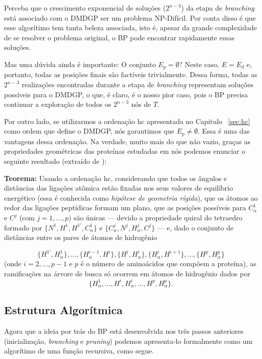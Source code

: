 \documentclass[a4paper,12pt]{article}
\begin{document}
	Perceba que o crescimento exponencial de soluções ($2^{n-3}$) da etapa de \textit{branching} está associado com o DMDGP ser um problema NP-Difícil. Por conta disso é que esse algorítimo tem tanta beleza associada, isto é, apesar da grande complexidade de se resolver o problema original, o BP pode encontrar rapidamente essas soluções.

	Mas uma dúvida ainda é importante: O conjunto $E_p = \emptyset$? Neste caso, $E = E_d$ e, portanto, todas as posições finais são factíveis trivialmente. Dessa forma, todas as $2^{n-3}$ realizações encontradas durante a etapa de \textit{branching} representam soluções possíveis para o DMDGP, o que, é claro, é o nosso pior caso, pois o BP precisa continuar a exploração de todos os $2^{n-3}$ nós de $T$. 
	
	Por outro lado, se utilizarmos a ordenação hc apresentada no Capitulo ~\ref{sec:hc} como ordem que define o DMDGP, nós garantimos que $E_p \neq \emptyset$. Essa é uma das vantagens dessa ordenação. Na verdade, muito mais do que não vazio, graças as propriedades geométricas das proteínas estudadas em \cite{carlile:MinimalOrder} nós podemos enunciar o seguinte resultado (extraído de \cite{carlile:MinimalOrder}): 

	\textbf{Teorema:} Usando a ordenação hc, considerando que todos os ângulos e distâncias das ligações atômica estão fixadas nos seus valores de equilíbrio energético (essa é conhecida como \textit{hipótese de geometria rígida}), que os átomos ao redor das ligações peptídicas formam um plano, que as posições possíveis para $C_\alpha^1$ e $C^j$ (com $j = 1, \dots,p$) são únicas --- devido a propriedade quiral do tetraedro formado por $\{N^1, H^1, H^{1\prime}, C_\alpha^1\}$ e $\{C_\alpha^j, N^j, H^j_\alpha,C^j\}$ --- e, dado o conjunto de distâncias entre os pares de átomos de hidrogênio
	
	$$\{H^{1\prime}, H^1_\alpha\}, \dots, \{H_\alpha^{i-1}, H^i\}, \{H^i, H^i_\alpha\}, \{H^i_\alpha, H^{i+1}\}, \dots, \{H^p, H^p_\alpha\}$$
	(onde $i = 2, \dots, p-1$ e $p$ é o número de aminoácidos que compõem a proteína), as ramificações na árvore de busca só ocorrem em átomos de hidrogênio dados por
	$$\{H_\alpha^1, \dots, H^i, H_\alpha^i, \dots, H^p, H_\alpha^p\}.$$	
	
	\subsection{Estrutura Algorítmica}
	Agora que a ideia por trás do BP está desenvolvida nos três passos anteriores (inicialização, \textit{branching} e \textit{pruning}) podemos apresenta-lo formalmente como um algorítimo de uma função recursiva, como segue.
	\\
	
\end{document}
